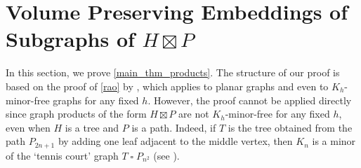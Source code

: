 \documentclass{patmorin}
\renewcommand{\le}{\leqslant}
\begin{document}




%


\section{\boldmath Volume Preserving Embeddings of Subgraphs of $H\boxtimes P$}

In this section, we prove \cref{main_thm_products}.  The structure of our proof is based on the proof of \cref{rao} by \citet{rao:small}, which applies to planar graphs and even to $K_{h}$-minor-free graphs for any fixed $h$.  However, the proof cannot be applied directly since graph products of the form $H\boxtimes P$ are not $K_h$-minor-free for any fixed $h$, even when $H$ is a tree and $P$ is a path. Indeed, if $T$ is the tree obtained from the path $P_{2n+1}$ by adding one leaf adjacent to the middle vertex, then $K_n$ is a minor of the `tennis court' graph $T\mathbin{\square} P_{n^2}$ (see  \citep{Wood-NYJM11}).
\end{document}
